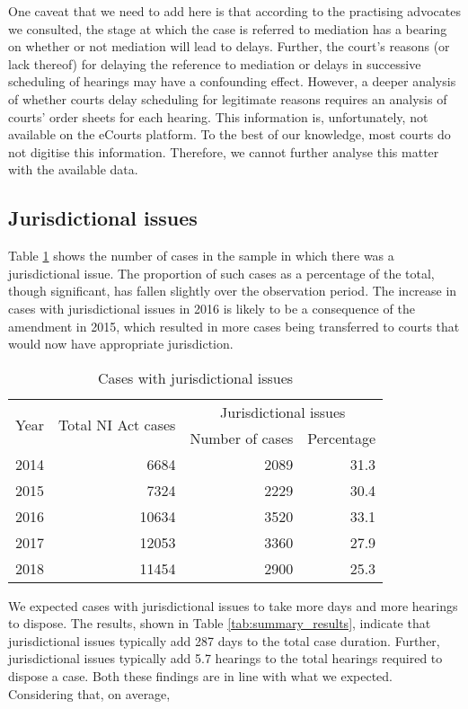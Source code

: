 One caveat that we need to add here is that according to the practising advocates we consulted, the stage at which the case is referred to mediation has a bearing on whether or not mediation will lead to delays. Further, the court's reasons (or lack thereof) for delaying the reference to mediation or delays in successive scheduling of hearings may have a confounding effect. However, a deeper analysis of whether courts delay scheduling for legitimate reasons requires an analysis of courts' order sheets for each hearing. This information is, unfortunately, not available on the eCourts platform. To the best of our knowledge, most courts do not digitise this information. Therefore, we cannot further analyse this matter with the available data.

\subsection{Jurisdictional issues}
\label{sec:jurisd-issu}

Table \ref{tab:jurisdiction_yearWise} shows the number of cases in the sample in which there was a jurisdictional issue. The proportion of such cases as a percentage of the total, though significant, has fallen slightly over the observation period. The increase in cases with jurisdictional issues in 2016 is likely to be a consequence of the amendment in 2015, which resulted in more cases being transferred to courts that would now have appropriate jurisdiction.

\begin{longtable}[h!]{@{}lrrr@{}}
 \caption{Cases with jurisdictional issues}\label{tab:jurisdiction_yearWise}\\
\toprule
\multirow{2}{*}{Year} & \multirow{2}{*}{Total NI Act cases} & \multicolumn{2}{c}{Jurisdictional issues}\\
\cmidrule{3-4}
&& Number of cases & Percentage \\
\midrule\endhead
2014 & 6684 & 2089 & 31.3 \\
2015 & 7324 & 2229 & 30.4 \\
2016 & 10634 & 3520 & 33.1 \\
2017 & 12053 & 3360 & 27.9 \\
2018 & 11454 & 2900 & 25.3 \\
\bottomrule
\end{longtable}

We expected cases with jurisdictional issues to take more days and more hearings to dispose. The results, shown in Table \ref{tab:summary_results}, indicate that jurisdictional issues typically add 287 days to the total case duration. Further, jurisdictional issues typically add 5.7 hearings to the total hearings required to dispose a case. Both these findings are in line with what we expected. Considering that, on average, 

